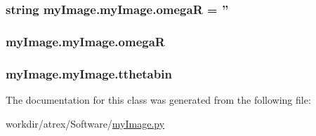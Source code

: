 \hypertarget{classmy_image_1_1my_image_ab739c7aa096b85bcdcce37dcb3c5c53c}{
\subsubsection[{omega\-R}]{\setlength{\rightskip}{0pt plus 5cm}string my\-Image.\-my\-Image.\-omega\-R = ''\hspace{0.3cm}{\ttfamily [static]}}}\label{classmy_image_1_1my_image_ab739c7aa096b85bcdcce37dcb3c5c53c}
\hypertarget{classmy_image_1_1my_image_a48c38f81bb2ec3d332ff80510eef2846}{
\subsubsection[{omega\-R}]{\setlength{\rightskip}{0pt plus 5cm}my\-Image.\-my\-Image.\-omega\-R}}\label{classmy_image_1_1my_image_a48c38f81bb2ec3d332ff80510eef2846}
\hypertarget{classmy_image_1_1my_image_a979ecbe45f1292ab528cefd83baad4c4}{
\subsubsection[{tthetabin}]{\setlength{\rightskip}{0pt plus 5cm}my\-Image.\-my\-Image.\-tthetabin}}\label{classmy_image_1_1my_image_a979ecbe45f1292ab528cefd83baad4c4}


The documentation for this class was generated from the following file\-:\begin{DoxyCompactItemize}
\item 
workdir/atrex/\-Software/\hyperlink{my_image_8py}{my\-Image.\-py}\end{DoxyCompactItemize}
